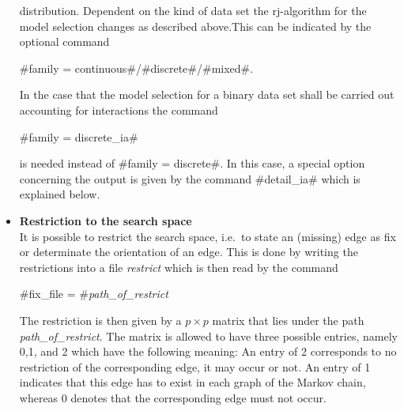 \begin{itemize}
distribution. Dependent on the kind of data set the rj-algorithm
for the model selection changes as described above.This can be
indicated by the optional command
\begin{center}
    #family = continuous#/#discrete#/#mixed#.\\
\end{center}
In the case that the model selection for a binary data set shall
be carried out accounting for interactions the command
\begin{center}
    #family = discrete_ia#\\
\end{center}
is needed instead of  #family = discrete#. In this case, a special
option concerning the output is given by the command #detail_ia#
which is explained below.
\item {\bf\sffamily Restriction to the search space}\\
It is possible to restrict the search space, i.e.~to state an
(missing) edge as fix or determinate the orientation of an edge.
This is done by writing the restrictions into a file {\em
restrict} which is then read by the command
\begin{center}
    #fix_file = #{\em path\_of\_restrict}\\
\end{center}
The restriction is then given by a $p \times p$ matrix that lies
under the path {\em path\_of\_restrict}. The matrix is allowed to
have three possible entries, namely  0,1, and 2 which have the
following meaning: An entry of 2 corresponds to no restriction of
the corresponding edge, it may occur or not. An entry of 1
indicates that this edge has to exist in each graph of the Markov
chain, whereas 0 denotes that the corresponding edge must not
occur.
\end{itemize}

